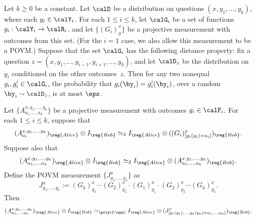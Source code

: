 \begin{fact}\label{fact:low-degree-sandwich-on-steroids}
Let $k \geq 0$ be a constant.
Let $\calD$ be a distribution on questions $(x, y_1, \ldots, y_k)$, where each $y_i \in \calY_i$.
For each $1 \leq i \leq k$, let $\calG_i$ be a set of functions $g_i : \calY_i \rightarrow \calR_i$.
and let $\{(G_i)^x_g\}$ be a projective measurement with outcomes from this set.
(For the $i=1$ case, we also allow this measurement to be a POVM.)
Suppose that the set $\calG_i$ has the following distance property:
fix a question $z = (x, y_1, \ldots, y_{i-1}, y_{i+1}, \ldots, y_k)$, and let $\calD_z$ be the distribution on~$y_i$ conditioned on the other outcomes~$z$.
Then for any two nonequal $g_i, g_i' \in \calG_i$, the probability that $g_i(\by_i) = g_i'(\by_i)$, over a random $\by_i \sim \calD_z$, is at most $\eps$.

Let $\{A^{x, y_1, \ldots, y_k}_{a_1, \ldots, a_k} \}$ be a projective measurement with outcomes $g_i \in \calF_i$.
For each $1 \leq i \leq k$, suppose that
\begin{equation}\label{eq:gonna-compare-like-a-pear}
(A^{x, y_1, \ldots, y_k}_{a_i})_{\reg{Alice}} \otimes I_{\reg{Bob}} \simeq_{\delta} I_{\reg{Alice}} \otimes ((G_i)^x_{[g_i(y_i)=a_i]})_{\reg{Bob}}.
\end{equation}
Suppose also that
\begin{equation}\label{eq:spend-some-time-reflecting}
(A^{x, y_1, \ldots, y_k}_{a_1, \ldots, a_k})_{\reg{Alice}} \otimes I_{\reg{Bob}}
	\simeq_{\delta} I_{\reg{Alice}} \otimes (A^{x, y_1, \ldots, y_k}_{a_1, \ldots, a_k})_{\reg{Bob}}.
\end{equation}
Define the POVM measurement $\{J^x_{g_1, \ldots, g_k}\}$ as
\begin{equation*}
J^x_{g_1, \ldots, g_k} := (G_k)^x_{g_k} \cdots (G_2)^x_{g_2} \cdot (G_1)^x_{g_1} \cdot (G_2)^x_{g_2} \cdots (G_k)^x_{g_k}.
\end{equation*}
Then
\begin{equation*}
(A^{x, y_1, \ldots, y_k}_{a_1, \ldots, a_k})_{\reg{Alice}} \otimes I_{\reg{Bob}}
	\simeq_{\poly(\delta, \eps)} I_{\reg{Alice}} \otimes (J^x_{[g_1(y_1), \ldots, g_k(y_k) = a_1, \ldots, a_k]})_{\reg{Bob}}.
\end{equation*}
\end{fact}
